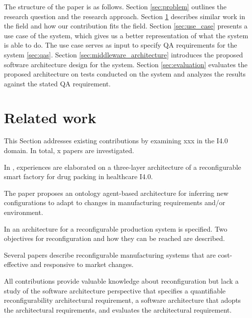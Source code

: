 \documentclass[conference]{IEEEtran}
\begin{document}
The structure of the paper is as follows.
Section \ref{sec:problem} outlines the research question and the research approach.
Section \ref{sec:related_work} describes similar work in the field and how our contribution fits the field.
Section \ref{sec:use_case} presents a use case of the system, which gives us a better representation of what the system is able to do.
The use case serves as input to specify QA requirements for the system \ref{sec:qas}.
Section \ref{sec:middleware_architecture} introduces the proposed software architecture design for the system.
Section \ref{sec:evaluation} evaluates the proposed architecture on tests conducted on the system and analyzes the results against the stated QA requirement.





\section{Related work}
\label{sec:related_work}
This Section addresses existing contributions by examining xxx in the I4.0 domain.
In total, x papers are investigated.

In \cite{Wan2019Reconfigurable}, experiences are elaborated on a three-layer architecture of a reconfigurable smart factory for drug packing in healthcare I4.0.


The paper \cite{Yazen2010Ontology} proposes an ontology agent-based architecture for inferring  new configurations to adapt to changes in manufacturing requirements and/or environment.



In \cite{Leitao2016Specification,Angione2017Integration} an architecture for a reconfigurable production system is specified.
Two objectives for reconfiguration and how they can be reached are described.


Several papers \cite{Koren1999Reconfigurable,Koren2010Design,Bortolini2018Reconfigurable} describe reconfigurable manufacturing systems that are cost-effective and responsive to market changes.

All contributions provide valuable knowledge about reconfiguration but lack a study of the software architecture perspective that specifies a quantifiable reconfigurability architectural requirement, a software architecture that adopts the architectural requirements, and evaluates the architectural requirement.
\end{document}
